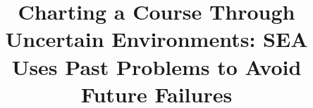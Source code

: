 \documentclass[conference]{IEEEtran}
\begin{document}
\title{Charting a Course Through Uncertain Environments: SEA Uses Past Problems to Avoid Future Failures}


\maketitle
\thispagestyle{plain}
\pagestyle{plain}












\end{document}
